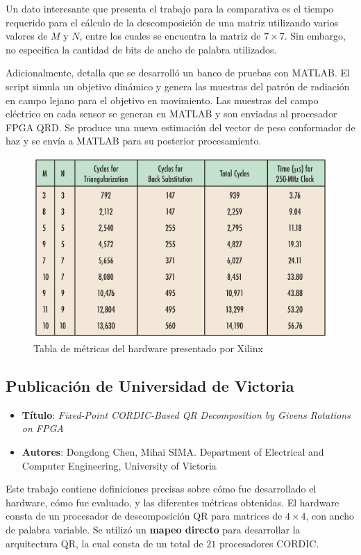 Un dato interesante que presenta el trabajo para la comparativa es el tiempo requerido para el cálculo de la descomposición de una matriz utilizando varios valores de $M$ y $N$, entre los cuales se encuentra la matriz de $7 \times 7$. Sin embargo, no especifica la cantidad de bits de ancho de palabra utilizados.

Adicionalmente, detalla que se desarrolló un banco de pruebas con MATLAB. El script simula un objetivo dinámico y genera las muestras del patrón de radiación en campo lejano para el objetivo en movimiento. Las muestras del campo eléctrico en cada sensor se generan en MATLAB y son enviadas al procesador FPGA QRD. Se produce una nueva estimación del vector de peso conformador de haz y se envía a MATLAB para su posterior procesamiento.

\begin{figure}[h!]
     \centering
     \includegraphics[width=12cm]{./figures/C03-xilinx_table}
     \caption{Tabla de métricas del hardware presentado por Xilinx}
     \label{fig:xilinx_table}
\end{figure}

\subsection{Publicación de Universidad de Victoria}

\begin{itemize}
\item[] \textbf{Título}: \textit{Fixed-Point CORDIC-Based QR Decomposition by Givens Rotations on FPGA}
\item[] \textbf{Autores}: Dongdong Chen, Mihai SIMA. Department of Electrical and Computer Engineering, University of Victoria
\end{itemize}

Este trabajo \cite{DongdongQR} contiene definiciones precisas sobre cómo fue desarrollado el hardware, cómo fue evaluado, y las diferentes métricas obtenidas. El hardware consta de un procesador de descomposición QR para matrices de $4 \times 4$, con ancho de palabra variable. Se utilizó un \textbf{mapeo directo} para desarrollar la arquitectura QR, la cual consta de un total de $21$ procesadores CORDIC.

